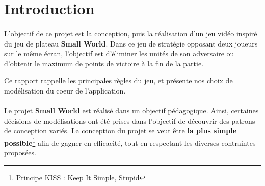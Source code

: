 \section*{Introduction}

\paragraph{}
L'objectif de ce projet est la conception, puis la réalisation d'un jeu vidéo inspiré du jeu de plateau \textbf{Small World}.
Dans ce jeu de stratégie opposant deux joueurs sur le même écran, l'objectif est d'éliminer les unités de son adversaire ou d'obtenir le maximum de points de victoire à la fin de la partie.

Ce rapport rappelle les principales règles du jeu, et présente nos choix de modélisation du coeur de l'application.

\paragraph{}
Le projet \textbf{Small World} est réalisé dans un objectif pédagogique. Ainsi, certaines décisions de modélisations ont été prises dans l'objectif de découvrir des patrons de conception variés.
La conception du projet se veut être \textbf{la plus simple possible}\footnote{Principe KISS : \og{} Keep It Simple, Stupid \fg{}} afin de gagner en efficacité, tout en respectant les diverses contraintes proposées.


